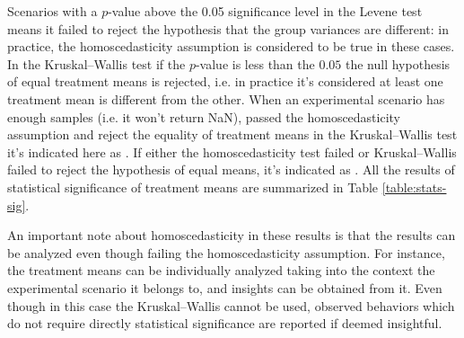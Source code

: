 Scenarios with a $p$-value above the 0.05 significance level in the Levene test means it failed to reject the hypothesis that the group variances are different: in practice, the homoscedasticity assumption is considered to be true in these cases. In the Kruskal–Wallis test if the $p$-value is less than the $0.05$ the null hypothesis of equal treatment means is rejected, i.e. in practice it's considered at least one treatment mean is different from the other. When an experimental scenario has enough samples (i.e. it won't return NaN), passed the homoscedasticity assumption and reject the equality of treatment means in the Kruskal–Wallis test it's indicated here as \ok. If either the homoscedasticity test failed or Kruskal–Wallis failed to reject the hypothesis of equal means, it's indicated as \notok. All the results of statistical significance of treatment means are summarized in Table \ref{table:stats-sig}.

An important note about homoscedasticity in these results is that the results can be analyzed even though failing the homoscedasticity assumption. For instance, the treatment means can be individually analyzed taking into the context the experimental scenario it belongs to, and insights can be obtained from it. Even though in this case the Kruskal–Wallis cannot be used, observed behaviors which do not require directly statistical significance are reported if deemed insightful.

